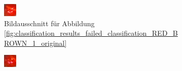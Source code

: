 \begin{figure}[h!]
\begin{subfigure}[b]{0.2\textwidth}
                \includegraphics[width=1.0\linewidth]{../common/04_results/resources/classification/failed_classification_RED_BROWN_1_roi.png}
                \caption{Bildausschnitt für Abbildung \ref{fig:classification_results_failed_classification_RED_BROWN_1_original}}
                \label{fig:classification_results_failed_classification_RED_BROWN_1_roi}
        \end{subfigure}
        \hfill
        \begin{subfigure}[b]{0.2\textwidth}
                \raggedright
                \includegraphics[width=1.0\linewidth]{../common/04_results/resources/classification/failed_classification_RED_BROWN_3_roi.png}

\end{subfigure}
\end{figure}
